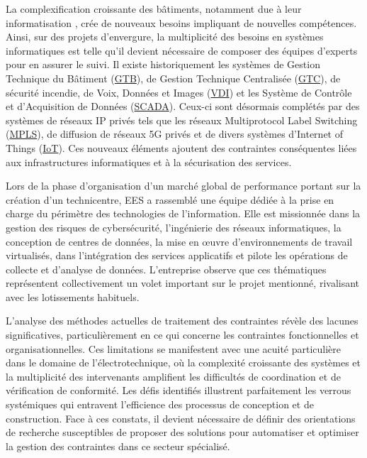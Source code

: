 \documentclass[a4paper,12pt]{article}
\begin{document}
La complexification croissante des bâtiments, notamment due à leur informatisation \autocite{DecretNdeg20208872020,SmartReadinessIndicatora}, crée de nouveaux besoins impliquant de nouvelles compétences. Ainsi, sur des projets d’envergure, la multiplicité des besoins en systèmes informatiques est telle qu’il devient nécessaire de composer des équipes d'experts pour en assurer le suivi. Il existe historiquement les systèmes de Gestion Technique du Bâtiment
 (\protect\hyperlink{gls-11}{\label{gls-11-use-1}GTB}), de Gestion Technique Centralisée
 (\protect\hyperlink{gls-12}{\label{gls-12-use-1}GTC}), de sécurité incendie, de Voix, Données et Images
 (\protect\hyperlink{gls-13}{\label{gls-13-use-1}VDI}) et les Système de Contrôle et d'Acquisition de Données
 (\protect\hyperlink{gls-14}{\label{gls-14-use-1}SCADA}). Ceux-ci sont désormais complétés par des systèmes de réseaux IP privés tels que les réseaux Multiprotocol Label Switching
 (\protect\hyperlink{gls-15}{\label{gls-15-use-1}MPLS}), de diffusion de réseaux 5G privés et de divers systèmes d’Internet of Things
 (\protect\hyperlink{gls-16}{\label{gls-16-use-1}IoT}). Ces nouveaux éléments ajoutent des contraintes conséquentes liées aux infrastructures informatiques et à la sécurisation des services.

Lors de la phase d’organisation d’un marché global de performance portant sur la création d’un technicentre, EES a rassemblé une équipe dédiée à la prise en charge du périmètre des technologies de l’information. Elle est missionnée dans la gestion des risques de cybersécurité, l'ingénierie des réseaux informatiques, la conception de centres de données, la mise en œuvre d’environnements de travail virtualisés, dans l’intégration des services applicatifs et pilote les opérations de collecte et d’analyse de données. L’entreprise observe que ces thématiques représentent collectivement un volet important sur le projet mentionné, rivalisant avec les lotissements habituels. 

L'analyse des méthodes actuelles de traitement des contraintes révèle des lacunes significatives, particulièrement en ce qui concerne les contraintes fonctionnelles et organisationnelles. Ces limitations se manifestent avec une acuité particulière dans le domaine de l'électrotechnique, où la complexité croissante des systèmes et la multiplicité des intervenants amplifient les difficultés de coordination et de vérification de conformité. Les défis identifiés illustrent parfaitement les verrous systémiques qui entravent l'efficience des processus de conception et de construction. Face à ces constats, il devient nécessaire de définir des orientations de recherche susceptibles de proposer des solutions pour automatiser et optimiser la gestion des contraintes dans ce secteur spécialisé.
\end{document}
